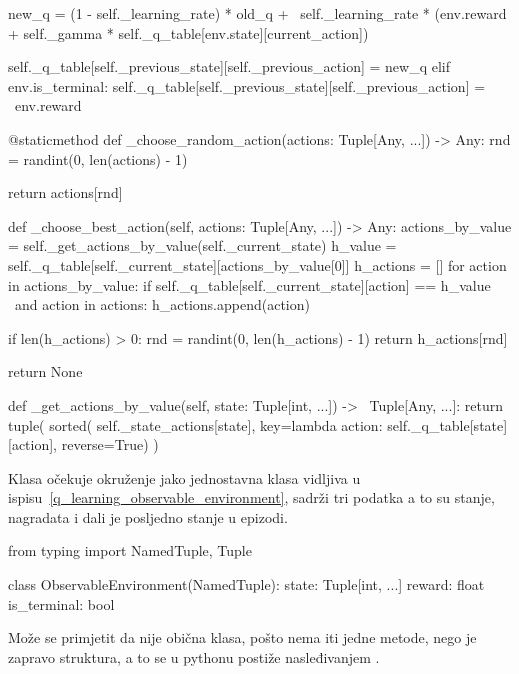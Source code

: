 \begin{python}[caption={Standardno q-učenje}, label=q_learning]
            new_q = (1 - self._learning_rate) * old_q + \
                self._learning_rate * (env.reward + self._gamma * 
                                        self._q_table[env.state][current_action])
		
            self._q_table[self._previous_state][self._previous_action] = new_q
        elif env.is_terminal:
            self._q_table[self._previous_state][self._previous_action] = \
                env.reward
	
    @staticmethod
    def _choose_random_action(actions: Tuple[Any, ...]) -> Any:
        rnd = randint(0, len(actions) - 1)
		
        return actions[rnd]
	
    def _choose_best_action(self, actions: Tuple[Any, ...]) -> Any:
        actions_by_value = self._get_actions_by_value(self._current_state)
        h_value = self._q_table[self._current_state][actions_by_value[0]]
        h_actions = []
        for action in actions_by_value:
            if self._q_table[self._current_state][action] == h_value \
                    and action in actions:
                h_actions.append(action)
		
        if len(h_actions) > 0:
            rnd = randint(0, len(h_actions) - 1)
            return h_actions[rnd]
		
        return None
	
    def _get_actions_by_value(self, state: Tuple[int, ...]) -> \
            Tuple[Any, ...]:
        return tuple(
            sorted(
                self._state_actions[state], 
                key=lambda action: self._q_table[state][action], 
                reverse=True)
        )

\end{python}
Klasa očekuje okruženje  jako jednostavna klasa vidljiva u ispisu~\ref{q_learning_observable_environment}, sadrži tri podatka a to su stanje, nagradata i dali je posljedno stanje u epizodi.
\begin{python}[caption={Očekivano okruženje q-učenja}, label={q_learning_observable_environment}]
from typing import NamedTuple, Tuple
	
class ObservableEnvironment(NamedTuple):
    state: Tuple[int, ...]
    reward: float
    is_terminal: bool
\end{python}
Može se primjetit da nije obična klasa, pošto nema iti jedne metode, nego je zapravo struktura, a to se u pythonu postiže nasleđivanjem .

